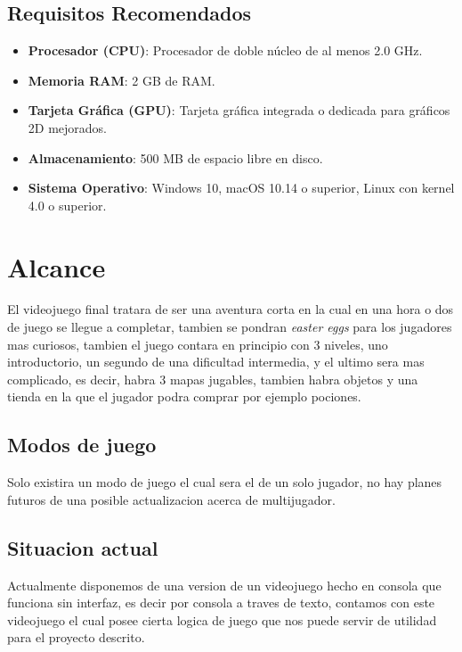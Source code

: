 \documentclass[a4paper]{article}
\begin{document}
\subsection{Requisitos Recomendados}

\begin{itemize}
    \item \textbf{Procesador (CPU)}: Procesador de doble núcleo de al menos 2.0 GHz.
    \item \textbf{Memoria RAM}: 2 GB de RAM.
    \item \textbf{Tarjeta Gráfica (GPU)}: Tarjeta gráfica integrada o dedicada para gráficos 2D mejorados.
    \item \textbf{Almacenamiento}: 500 MB de espacio libre en disco.
    \item \textbf{Sistema Operativo}: Windows 10, macOS 10.14 o superior, Linux con kernel 4.0 o superior.
\end{itemize}



    \clearpage



    \section{Alcance}
    El videojuego final tratara de ser una aventura corta en la cual en una hora o dos de juego se llegue a completar, tambien se pondran \textit{easter eggs} para los jugadores mas curiosos, tambien el juego contara en principio
    con 3 niveles, uno introductorio, un segundo de una dificultad intermedia, y el ultimo sera mas complicado, es decir, habra 3 mapas jugables, tambien habra objetos y una tienda en la que el jugador podra comprar por ejemplo pociones.
    \subsection{Modos de juego}
    Solo existira un modo de juego el cual sera el de un solo jugador, no hay planes futuros de una posible actualizacion acerca de multijugador. 
    \subsection{Situacion actual}
    Actualmente disponemos de una version de un videojuego hecho en consola que funciona sin interfaz, es decir por consola a traves de texto,
    contamos con este videojuego el cual posee cierta logica de juego que nos puede servir de utilidad para el proyecto descrito.
    
\end{document}
